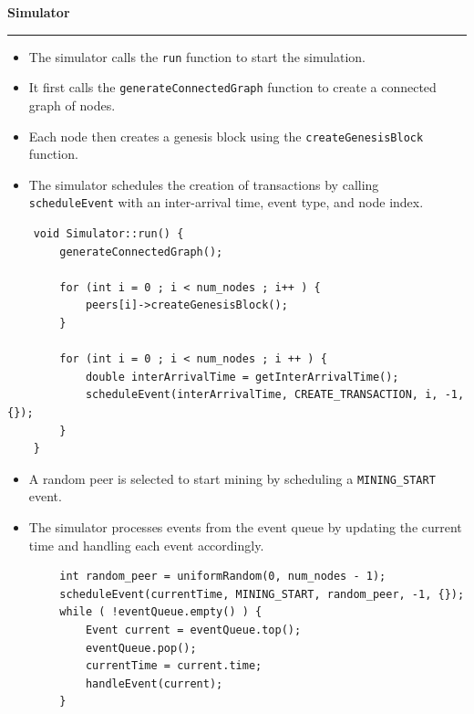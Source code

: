 \documentclass[a4paper,12pt]{article}
\newenvironment{solution}[2][]{%
\begin{mdframed}[linecolor=blue!70!black, linewidth=2pt, roundcorner=10pt, backgroundcolor=yellow!10!white, skipabove=12pt, skipbelow=12pt]%
	\textbf{\large #2}
	\par\noindent\rule{\textwidth}{0.4pt}
}{
\end{mdframed}
}
\begin{document}
\begin{solution}{Simulator}
	\begin{itemize}
		\item The simulator calls the \texttt{run} function to start the simulation.
		\item It first calls the \texttt{generateConnectedGraph} function to create a connected graph of nodes.
		\item Each node then creates a genesis block using the \texttt{createGenesisBlock} function.
		\item The simulator schedules the creation of transactions by calling \texttt{scheduleEvent} with an inter-arrival time, event type, and node index.
	\end{itemize}
	
	\begin{mdframed}[linecolor=black, linewidth=2pt, roundcorner=10pt, backgroundcolor=yellow!10!white, skipabove=12pt, skipbelow=12pt]
	\begin{verbatim}
	void Simulator::run() {
		generateConnectedGraph();
		
		for (int i = 0 ; i < num_nodes ; i++ ) {
			peers[i]->createGenesisBlock();
		}
		
		for (int i = 0 ; i < num_nodes ; i ++ ) {
			double interArrivalTime = getInterArrivalTime();
			scheduleEvent(interArrivalTime, CREATE_TRANSACTION, i, -1, {});
		}
	}
	\end{verbatim}
	\end{mdframed}

	\begin{itemize}
		\item A random peer is selected to start mining by scheduling a \texttt{MINING\_START} event.
		\item The simulator processes events from the event queue by updating the current time and handling each event accordingly.
	\end{itemize}
	
	\begin{mdframed}[linecolor=black, linewidth=2pt, roundcorner=10pt, backgroundcolor=yellow!10!white, skipabove=12pt, skipbelow=12pt]
	\begin{verbatim}
		int random_peer = uniformRandom(0, num_nodes - 1);
		scheduleEvent(currentTime, MINING_START, random_peer, -1, {});
		while ( !eventQueue.empty() ) {
			Event current = eventQueue.top();
			eventQueue.pop();
			currentTime = current.time;
			handleEvent(current);
		}
	\end{verbatim}
	\end{mdframed}
	
\end{solution}
\end{document}
